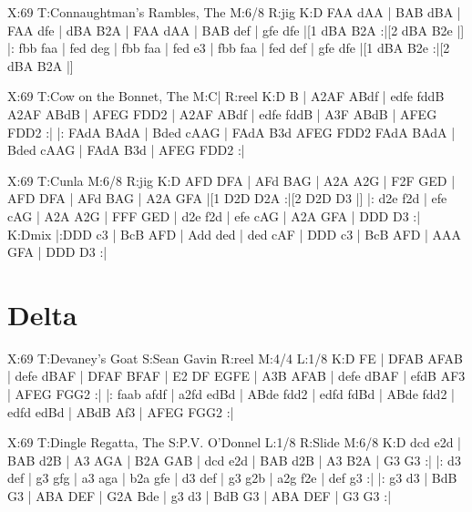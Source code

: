 \documentclass{article}
\begin{document}
\begin{abc}[name]
X:69
T:Connaughtman's Rambles, The
M:6/8
R:jig
K:D
FAA dAA | BAB dBA | FAA dfe | dBA B2A |
FAA dAA | BAB def | gfe dfe |[1 dBA B2A :|[2 dBA B2e |]
|: fbb faa | fed deg | fbb faa | fed e3 |
fbb faa | fed def | gfe dfe |[1 dBA B2e :|[2 dBA B2A |]
\end{abc}

\begin{abc}[name]
X:69
T:Cow on the Bonnet, The
M:C|
R:reel
K:D
B | A2AF ABdf | edfe fddB A2AF ABdB | AFEG FDD2 |
A2AF ABdf | edfe fddB | A3F ABdB | AFEG FDD2 :|
|: FAdA BAdA | Bded cAAG | FAdA B3d AFEG FDD2
FAdA BAdA | Bded cAAG | FAdA B3d | AFEG FDD2 :|
\end{abc}

\begin{abc}[name]
X:69
T:Cunla
M:6/8
R:jig
K:D
AFD DFA | AFd BAG | A2A A2G | F2F GED |
AFD DFA | AFd BAG | A2A GFA |[1 D2D D2A :|[2 D2D D3 |]
|: d2e f2d | efe cAG | A2A A2G | FFF GED |
d2e f2d | efe cAG | A2A GFA | DDD D3 :|
K:Dmix
|:DDD c3 | BcB AFD | Add ded | ded cAF |
DDD c3 | BcB AFD | AAA GFA | DDD D3 :|
\end{abc}

\section{Delta}

\begin{abc}[name]
X:69
T:Devaney's Goat
S:Sean Gavin
R:reel
M:4/4
L:1/8
K:D
FE | DFAB AFAB | defe dBAF | DFAF BFAF | E2 DF EGFE |
A3B AFAB | defe dBAF | efdB AF3 | AFEG FGG2 :|
|: faab afdf | a2fd edBd | ABde fdd2 | edfd fdBd |
ABde fdd2 | edfd edBd | ABdB Af3 | AFEG FGG2 :|
\end{abc}

\begin{abc}[name]
X:69
T:Dingle Regatta, The
S:P.V. O'Donnel
L:1/8
R:Slide
M:6/8
K:D
dcd e2d | BAB d2B | A3 AGA | B2A GAB |
dcd e2d | BAB d2B | A3 B2A | G3 G3 :|
|: d3 def | g3 gfg | a3 aga | b2a gfe |
d3 def | g3 g2b | a2g f2e | def g3 :|
|: g3 d3 | BdB G3 | ABA DEF | G2A Bde |
g3 d3 | BdB G3 | ABA DEF | G3 G3 :|
\end{abc}
\end{document}
